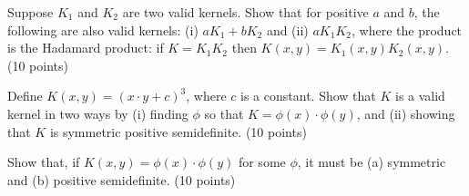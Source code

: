 \documentclass[fleqn]{homework}
\begin{document}
  \maketitle

  \begin{problem}{1}
    \begin{question}
      Suppose $K_1$ and $K_2$ are two valid kernels. Show that for positive $a$
      and $b$, the following are also valid kernels: (i) $aK_1+bK_2$ and (ii)
      $aK_1K_2$, where the product is the Hadamard product: if $K=K_1K_2$ then
      $K(x,y)=K_1(x,y)K_2(x,y)$. (10 points)
    \end{question}
  \end{problem}

  \begin{problem}{2}
    \begin{question}
      Define $K(x,y)=(x \cdot y+c)^3$, where $c$ is a constant. Show that $K$ is
      a valid kernel in two ways by (i) finding $\phi$ so that
      $K = \phi(x) \cdot \phi(y)$, and (ii) showing that $K$ is symmetric
      positive semidefinite. (10 points)
    \end{question}
  \end{problem}

  \begin{problem}{3}
    \begin{question}
      Show that, if $K(x,y) = \phi(x) \cdot \phi(y)$ for some $\phi$, it must be
      (a) symmetric and (b) positive semidefinite. (10 points)
    \end{question}
  \end{problem}
\end{document}
